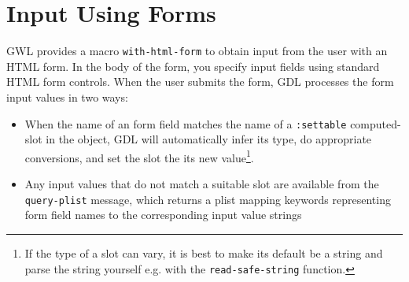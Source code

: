 \documentclass [11pt]{book}
\begin{document}
\section{Input Using Forms}

\label{sec:inputusingforms}



GWL provides a macro \texttt{with-html-form} to obtain input from the user
with an HTML form.  In the body of the form, you specify input fields using standard HTML
form controls.  When the user submits the form, GDL processes the form input values in two
ways:

\begin{itemize}

\item When the name of an form field matches the name of a \texttt{:settable} computed-slot in the object, GDL will automatically infer its type, do
appropriate conversions, and set the slot the its new value\footnote{If the type of a slot
can vary, it is best to make its default be a string and parse the string yourself e.g. with
the \texttt{read-safe-string} function.}.

\item Any input values that do not match a suitable slot are available 
from the \texttt{query-plist} message, which returns a plist mapping
keywords representing form field names to the corresponding input value strings

\end{itemize}
\end{document}
